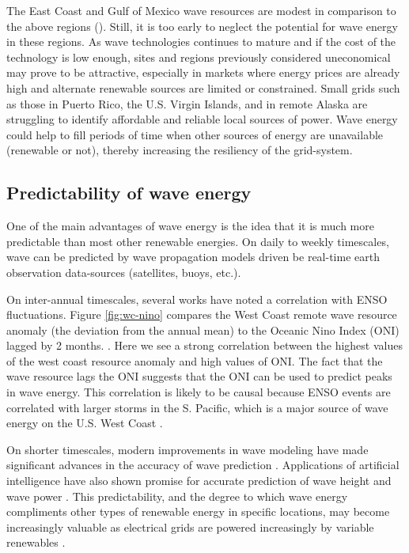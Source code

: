 The East Coast and Gulf of Mexico wave resources are modest in comparison to the above regions (). Still, it is too early to neglect the potential for wave energy in these regions. As wave technologies continues to mature and if the cost of the technology is low enough, sites and regions previously considered uneconomical may prove to be attractive, especially in markets where energy prices are already high and alternate renewable sources are limited or constrained. Small grids such as those in Puerto Rico, the U.S. Virgin Islands, and in remote Alaska are struggling to identify affordable and reliable local sources of power. Wave energy could help to fill periods of time when other sources of energy are unavailable (renewable or not), thereby increasing the resiliency of the grid-system.

\subsection{Predictability of wave energy}
One of the main advantages of wave energy is the idea that it is much more predictable than most other renewable energies. On daily to weekly timescales, wave can be predicted by wave propagation models driven be real-time earth observation data-sources (satellites, buoys, etc.).

On inter-annual timescales, several works have noted a correlation with ENSO fluctuations. Figure \ref{fig:wc-nino} compares the West Coast remote wave resource anomaly (the deviation from the annual mean) to the Oceanic Nino Index (ONI) lagged by 2 months. \cite{nationaloceanicandatmosphericadministrationOceanicNinoIndex2020}.
Here we see a strong correlation between the highest values of the west coast resource anomaly and high values of ONI. The fact that the wave resource lags the ONI suggests that the ONI can be used to predict peaks in wave energy. This correlation is likely to be causal because ENSO events are correlated with larger storms in the S. Pacific, which is a major source of wave energy on the U.S. West Coast \citep{andersonClimateIndexOptimized2018, yangCharacteristicsVariabilityNearshore2020, ruggieroNationalAssessmentShoreline2013}.

On shorter timescales, modern improvements in wave modeling have made significant advances in the accuracy of wave prediction \citep{cavaleriWaveModellingCoastal2018}. Applications of artificial intelligence have also shown promise for accurate prediction of wave height and wave power \citep[e.g.][]{cornejo-bueno_significant_2016}. This predictability, and the degree to which wave energy compliments other types of renewable energy in specific locations, may become increasingly valuable as electrical grids are powered increasingly by variable renewables \cite{parkinsonIntegratingOceanWave2015}.

